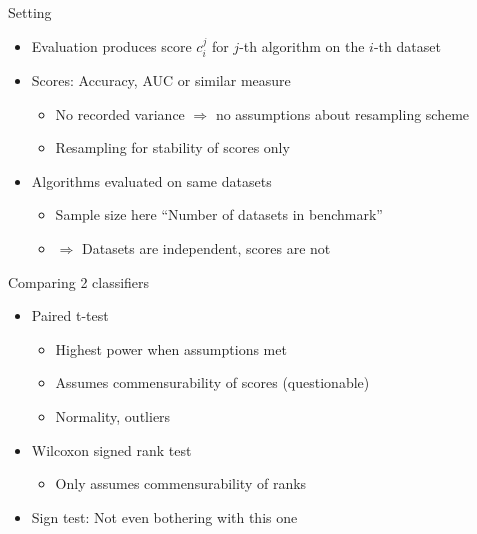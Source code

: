 \documentclass[aspectratio=169,12pt]{beamer}
\providecommand{\tightlist}{%
  \setlength{\itemsep}{2pt}\setlength{\parskip}{0pt}}
\begin{document}
\begin{frame}{Setting}
\label{setting}
\begin{itemize}[<+->]
\tightlist
\item
  Evaluation produces score \(c_i^j\) for \(j\)-th algorithm on the
  \(i\)-th dataset
\item
  Scores: Accuracy, AUC or similar measure

  \begin{itemize}[<+->]
  \tightlist
  \item
    No recorded variance \(\Rightarrow\) no assumptions about resampling
    scheme
  \item
    Resampling for stability of scores only
  \end{itemize}
\item
  Algorithms evaluated on same datasets

  \begin{itemize}[<+->]
  \tightlist
  \item
    Sample size here ``Number of datasets in benchmark''
  \item
    \(\Rightarrow\) Datasets are independent, scores are not
  \end{itemize}
\end{itemize}
\end{frame}

\begin{frame}{Comparing 2 classifiers}
\label{comparing-2-classifiers}
\begin{itemize}
\tightlist
\item
  Paired t-test

  \begin{itemize}
  \tightlist
  \item
    Highest power when assumptions met
  \item
    Assumes commensurability of scores (questionable)
  \item
    Normality, outliers
  \end{itemize}
\end{itemize}

\pause

\begin{itemize}
\tightlist
\item
  Wilcoxon signed rank test

  \begin{itemize}
  \tightlist
  \item
    Only assumes commensurability of ranks
  \end{itemize}
\end{itemize}

\pause

\begin{itemize}
\tightlist
\item
  Sign test: Not even bothering with this one
\end{itemize}
\end{frame}
\end{document}

